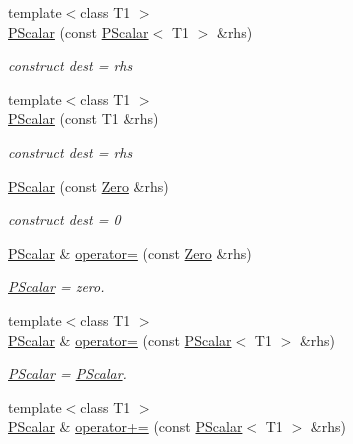 \begin{DoxyCompactItemize}
{\footnotesize template$<$class T1 $>$ }\\\mbox{\hyperlink{classENSEM_1_1PScalar_a5dad766fb1a59a9e23d03b31f22916bb}{P\+Scalar}} (const \mbox{\hyperlink{classENSEM_1_1PScalar}{P\+Scalar}}$<$ T1 $>$ \&rhs)
\begin{DoxyCompactList}\small\item\em construct dest = rhs \end{DoxyCompactList}\item 
{\footnotesize template$<$class T1 $>$ }\\\mbox{\hyperlink{classENSEM_1_1PScalar_a99cdd295d67d2d32aa481a4a8d9dcc1b}{P\+Scalar}} (const T1 \&rhs)
\begin{DoxyCompactList}\small\item\em construct dest = rhs \end{DoxyCompactList}\item 
\mbox{\hyperlink{classENSEM_1_1PScalar_a9d7f56a0caeb05ee423b451d2f3aae3b}{P\+Scalar}} (const \mbox{\hyperlink{structENSEM_1_1Zero}{Zero}} \&rhs)
\begin{DoxyCompactList}\small\item\em construct dest = 0 \end{DoxyCompactList}\item 
\mbox{\hyperlink{classENSEM_1_1PScalar}{P\+Scalar}} \& \mbox{\hyperlink{classENSEM_1_1PScalar_a4357d579e24371f6384da9008f4512b3}{operator=}} (const \mbox{\hyperlink{structENSEM_1_1Zero}{Zero}} \&rhs)
\begin{DoxyCompactList}\small\item\em \mbox{\hyperlink{classENSEM_1_1PScalar}{P\+Scalar}} = zero. \end{DoxyCompactList}\item 
{\footnotesize template$<$class T1 $>$ }\\\mbox{\hyperlink{classENSEM_1_1PScalar}{P\+Scalar}} \& \mbox{\hyperlink{classENSEM_1_1PScalar_ae69d6f1ad8ec0b65652f8d16c5f97b11}{operator=}} (const \mbox{\hyperlink{classENSEM_1_1PScalar}{P\+Scalar}}$<$ T1 $>$ \&rhs)
\begin{DoxyCompactList}\small\item\em \mbox{\hyperlink{classENSEM_1_1PScalar}{P\+Scalar}} = \mbox{\hyperlink{classENSEM_1_1PScalar}{P\+Scalar}}. \end{DoxyCompactList}\item 
{\footnotesize template$<$class T1 $>$ }\\\mbox{\hyperlink{classENSEM_1_1PScalar}{P\+Scalar}} \& \mbox{\hyperlink{classENSEM_1_1PScalar_a9c8d9e51f9d0a13b4b4aa9992812eea8}{operator+=}} (const \mbox{\hyperlink{classENSEM_1_1PScalar}{P\+Scalar}}$<$ T1 $>$ \&rhs)

\end{DoxyCompactItemize}

